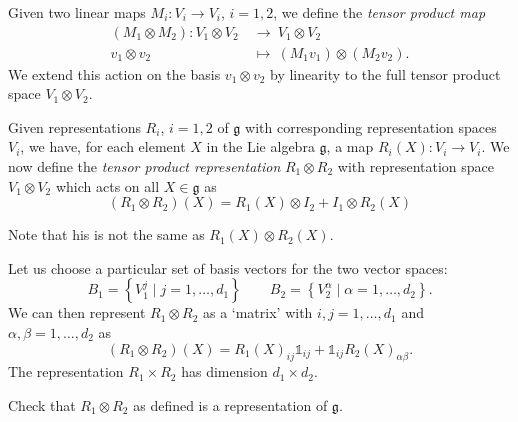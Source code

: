 \begin{definition}[]
  Given two linear maps $M_i \colon V_i \to V_i$, $i = 1, 2$, we define the \emph{tensor product map}
  \begin{equation}
    \begin{split}
      (M_1 \otimes M_2) \colon V_1 \otimes V_2 \ &\to\  V_1 \otimes V_2 \\
      v_1 \otimes v_2 \ &\mapsto\  (M_1 v_1) \otimes (M_2 v_2).
    \end{split}
  \end{equation}
  We extend this action on the basis $v_1 \otimes v_2$ by linearity to the full tensor product space $V_1 \otimes V_2$.
\end{definition}

\begin{definition}[]
  \label{def:tensor-product-rep}
  Given representations $R_i$, $i = 1, 2$ of $\mathfrak{g}$ with corresponding representation spaces $V_i$, we have, for each element $X$ in the Lie algebra $\mathfrak{g}$, a map $R_i(X) \colon V_i \to V_i$.
  We now define the \emph{tensor product representation} $R_1 \otimes R_2$ with representation space $V_1 \otimes V_2$ which acts on all $X \in \mathfrak{g}$ as
  \begin{equation}
    \boxed{(R_1 \otimes R_2)(X) = R_1(X) \otimes I_2 + I_1 \otimes R_2(X)}
  \end{equation}
\end{definition}
\begin{leftbar}
  \begin{remark}
    Note that his is not the same as $R_1(X) \otimes R_2(X)$.
  \end{remark}
\end{leftbar}
Let us choose a particular set of basis vectors for the two vector spaces:
\begin{equation}
  B_1 = \left\{ V_1^j \mid j = 1, \dots , d_1 \right\} \qquad B_2 = \left\{ V_2^\alpha \mid \alpha = 1 ,\dots, d_2 \right\}.
\end{equation}
We can then represent $R_1 \otimes R_2$ as a `matrix' with $i, j = 1 , \dots, d_1$ and $\alpha, \beta = 1, \dots, d_2$ as
\begin{equation}
  (R_1 \otimes R_2)(X) = R_1(X)_{ij} \mathbb{1}_{ij} + \mathbb{1}_{ij} R_2(X)_{\alpha\beta}.
\end{equation}
The representation $R_1 \times R_2$ has dimension $d_1 \times d_2$.

\begin{exercise}
  Check that $R_1 \otimes R_2$ as defined is a representation of $\mathfrak{g}$.
\end{exercise}

